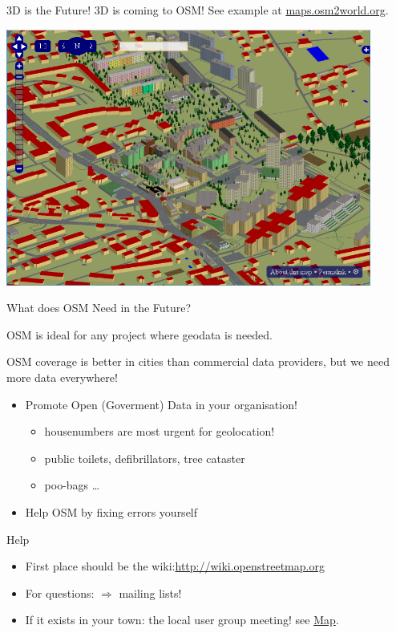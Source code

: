 \documentclass{beamer}
\begin{document}
\begin{frame}{3D is the Future!}
  3D is coming to OSM! See example at \href{http://maps.osm2world.org/?zoom=17&lat=47.06156&lon=15.46983&layers=BF0FTFFF}{maps.osm2world.org}.

  \includegraphics[width=0.9\textwidth]{3d.png}


\end{frame}

\begin{frame}{What does OSM Need in the Future?}

  OSM is ideal for any project where geodata is needed.

  OSM coverage is better in cities than commercial data providers, but we need more data everywhere!

  \begin{itemize}
    \item Promote Open (Goverment) Data in your organisation!
      \begin{itemize}
        \item housenumbers are most urgent for geolocation!
        \item public toilets, defibrillators, tree cataster
        \item poo-bags \dots
      \end{itemize}
    \item Help OSM by fixing errors yourself
  \end{itemize}

\end{frame}



\begin{frame}{Help}

\begin{itemize}
  \item First place should be the wiki:\url{http://wiki.openstreetmap.org}
  \item For questions: $\Rightarrow$ mailing lists!
  \pause
\item If it exists in your town: the local user group meeting! see \href{http://usergroups.openstreetmap.de/}{Map}.
\end{itemize}

\end{frame}
\end{document}
